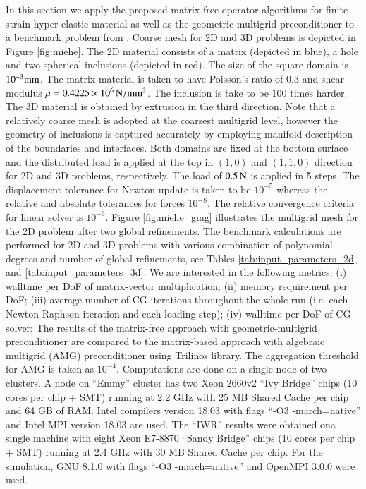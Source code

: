 \documentclass[preprint,12pt,times]{elsarticle}
\begin{document}
In this section we apply the proposed matrix-free operator algorithms for finite-strain hyper-elastic material as well as the geometric multigrid preconditioner to a benchmark problem from \cite{Miehe2007}. Coarse mesh for 2D and 3D problems is depicted in Figure \ref{fig:miehe}. The 2D material consists of a matrix (depicted in blue), a hole and two spherical inclusions (depicted in red). The size of the square domain is $10^{-3} \rm{mm}$.
The matrix material is taken to have Poisson's ratio of $0.3$ and shear modulus $\mu=0.4225 \times 10^6\, \rm{N/mm^2}$. The inclusion is take to be $100$ times harder.
The 3D material is obtained by extrusion in the third direction.
Note that a relatively coarse mesh is adopted at the coarsest multigrid level, however the geometry of inclusions is captured accurately by employing manifold description of the boundaries and interfaces.
Both domains are fixed at the bottom surface and the distributed load is applied at the top in $(1,0)$ and $(1,1,0)$ direction for 2D and 3D problems, respectively.
The load of $0.5\,\rm{N}$ is applied in 5 steps. The displacement tolerance for Newton update is taken to be $10^{-5}$ whereas the relative and absolute tolerances for forces $10^{-8}$. The relative convergence criteria for linear solver is $10^{-6}$.
%
Figure \ref{fig:miehe_gmg} illustrates the multigrid mesh for the 2D problem after two global refinements.
%
The benchmark calculations are performed for 2D and 3D problems with various combination of polynomial degrees and number of global refinements, see Tables \ref{tab:input_parameters_2d} and \ref{tab:input_parameters_3d}.
%
We are interested in the following metrics:
(i) walltime per DoF of matrix-vector multiplication;
(ii) memory requirement per DoF;
(iii) average number of CG iterations throughout the whole run (i.e. each Newton-Raphson iteration and each loading step);
(iv) walltime per DoF of CG solver;
%
The results of the matrix-free approach with geometric-multigrid preconditioner are compared to the matrix-based approach with algebraic multigrid (AMG) preconditioner using Trilinos \cite{Heroux2005} library.
The aggregation threshold for AMG is taken as $10^{-4}$.
Computations are done on a single node of two clusters.
A node on ``Emmy'' cluster has two Xeon 2660v2 ``Ivy Bridge'' chips (10 cores per chip + SMT) running at 2.2 GHz with 25 MB Shared Cache per chip and 64 GB of RAM. Intel compilers version 18.03 with flags ``-O3 -march=native'' and Intel MPI version 18.03 are used.
The ``IWR'' results were obtained ona single machine with eight Xeon E7-8870 ``Sandy Bridge'' chips (10 cores per chip  + SMT) running at 2.4 GHz with 30 MB Shared Cache per chip. For the simulation, GNU 8.1.0 with flags ``-O3 -march=native'' and OpenMPI 3.0.0 were used.
\end{document}
